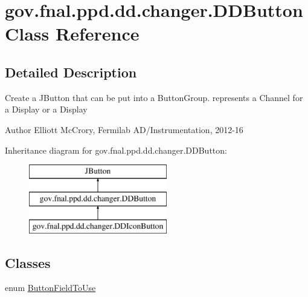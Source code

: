 \hypertarget{classgov_1_1fnal_1_1ppd_1_1dd_1_1changer_1_1DDButton}{\section{gov.\-fnal.\-ppd.\-dd.\-changer.\-D\-D\-Button Class Reference}
\label{classgov_1_1fnal_1_1ppd_1_1dd_1_1changer_1_1DDButton}
}


\subsection{Detailed Description}
Create a J\-Button that can be put into a Button\-Group. represents a Channel for a Display or a Display

\begin{DoxyAuthor}{Author}
Elliott Mc\-Crory, Fermilab A\-D/\-Instrumentation, 2012-\/16 
\end{DoxyAuthor}
Inheritance diagram for gov.\-fnal.\-ppd.\-dd.\-changer.\-D\-D\-Button\-:\begin{figure}[H]
\begin{center}
\leavevmode
\includegraphics[height=3.000000cm]{classgov_1_1fnal_1_1ppd_1_1dd_1_1changer_1_1DDButton}
\end{center}
\end{figure}
\subsection*{Classes}
\begin{DoxyCompactItemize}
\item 
enum \hyperlink{enumgov_1_1fnal_1_1ppd_1_1dd_1_1changer_1_1DDButton_1_1ButtonFieldToUse}{Button\-Field\-To\-Use}
\end{DoxyCompactItemize}
